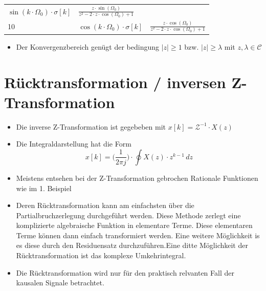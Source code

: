 \documentclass[11pt]{article}
\providecommand{\tightlist}{%
      \setlength{\itemsep}{0pt}\setlength{\parskip}{0pt}}
\begin{document}
\begin{longtable}[]{@{}lll@{}}
\begin{minipage}[t]{0.28\columnwidth}
\(\sin (k\cdot\Omega_0)\cdot\sigma[k]\)\strut
\end{minipage} & \begin{minipage}[t]{0.58\columnwidth}\raggedright\strut
\(\frac{z\cdot\sin(\Omega_0)}{z^2-2\cdot z\cdot\cos(\Omega_0)+1}\)\strut
\end{minipage}\tabularnewline
\begin{minipage}[t]{0.05\columnwidth}\raggedright\strut
10\strut
\end{minipage} & \begin{minipage}[t]{0.28\columnwidth}\raggedright\strut
\(\cos (k\cdot\Omega_0)\cdot\sigma[k]\)\strut
\end{minipage} & \begin{minipage}[t]{0.58\columnwidth}\raggedright\strut
\(\frac{z\cdot\cos(\Omega_0)}{z^2-2\cdot z\cdot\cos(\Omega_0)+1}\)\strut
\end{minipage}\tabularnewline
\bottomrule
\end{longtable}

    \begin{itemize}
\tightlist
\item
  Der Konvergenzbereich genügt der bedingung \(|z| \geq 1\) bzw.
  \(|z| \geq \lambda\) mit \(z, \lambda\in \mathcal{C}\)
\end{itemize}

    \section{Rücktransformation / inversen
Z-Transformation}\label{ruxfccktransformation-inversen-z-transformation}

\begin{itemize}
\item
  Die inverse Z-Transformation ist gegebeben mit
  \(x[k] = \mathcal{Z}^{-1} \cdot X(z)\)
\item
  Die Integraldarstellung hat die Form
  \[x[k] = \big( \frac{1}{2\pi j} \big) \cdot \oint X(z) \cdot z^{k-1}\,dz\]
\item
  Meistens entsehen bei der Z-Transformation gebrochen Rationale
  Funktionen wie im 1. Beispiel
\item
  Deren Rücktransformation kann am einfachsten über die
  Partialbruchzerlegung durchgeführt werden. Diese Methode zerlegt eine
  komplizierte algebraische Funktion in elementare Terme. Diese
  elementaren Terme können dann einfach transformiert werden. Eine
  weitere Möglichkeit is es diese durch den Residuensatz
  durchzuführen.Eine ditte Möglichkeit der Rücktransformation ist das
  komplexe Umkehrintegral.
\item
  Die Rücktransformation wird nur für den praktisch relvanten Fall der
  kausalen Signale betrachtet.
\end{itemize}
\end{document}
